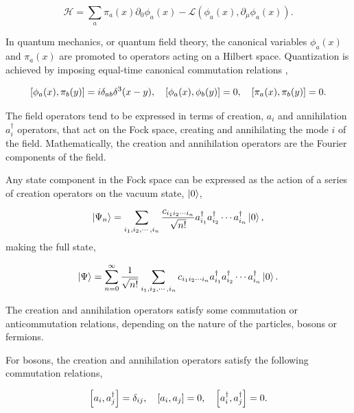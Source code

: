 \documentclass[11pt,a4paper,twoside,pdf]{article}
\numberwithin{equation}{section}
\begin{document}
\begin{equation}
    \mathcal{H} = \sum_a \pi_a (x) \partial_0 \phi_a (x) - 
    \mathcal{L}(\phi_a (x),\partial_\mu\phi_a (x)).
\end{equation}

In quantum mechanics, or quantum field theory, the canonical variables 
\( \phi_a(x) \) and \( \pi_a(x) \) are promoted to operators acting on 
a Hilbert space. Quantization is achieved by imposing equal-time canonical 
commutation relations \cite{Bjorken:100769},

\begin{equation}
    \left[ \phi_a (x), \pi_b (y) \right] = i \delta_{ab} \delta^3(x-y),
    \quad \left[ \phi_a (x), \phi_b (y) \right] = 0, \quad
    \left[ \pi_a (x), \pi_b (y) \right] = 0.
\end{equation}

The field operators tend to be expressed in terms of creation, $a_i$ and annihilation 
$a^\dagger_i$ operators, that act on the Fock space, creating and annihilating the mode 
$i$ of the field. Mathematically, the creation and annihilation operators are the 
Fourier components of the field.

Any state component in the Fock space can be expressed as the action of a series of 
creation operators on the vacuum state, $\ket{0}$,

\begin{equation}
    \ket{\Psi_n} = \sum_{i_1,i_2,\cdots,i_n} \frac{c_{i_1 i_2 \cdots i_n}}{\sqrt{n!}}
    a^\dagger_{i_1} a^\dagger_{i_2} \cdots a^\dagger_{i_n} \ket{0},
\end{equation}
making the full state, 

\begin{equation}
    \ket{\Psi} = \sum_{n=0}^{\infty} \frac{1}{\sqrt{n!}} \sum_{i_1,i_2,\cdots,i_n} 
    c_{i_1 i_2 \cdots i_n} a^\dagger_{i_1} a^\dagger_{i_2} \cdots a^\dagger_{i_n} \ket{0}.
\end{equation}

The creation and annihilation operators satisfy some commutation or anticommutation 
relations, depending on the nature of the particles, bosons or fermions. 

For bosons, the creation and annihilation operators satisfy the following commutation 
relations,

\begin{equation}
    \left[ a_i, a_j^\dagger \right] = \delta_{ij}, \quad
    \left[ a_i, a_j \right] = 0, \quad
    \left[ a_i^\dagger, a_j^\dagger \right] = 0.
\end{equation}
\end{document}
